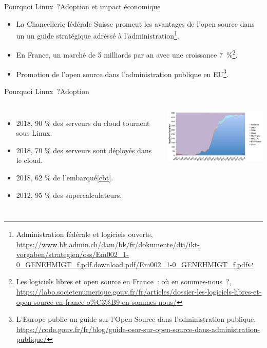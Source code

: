 \documentclass{beamer}
\begin{document}
    \begin{frame}{Pourquoi Linux~?}{Adoption et impact économique}
        \begin{itemize}
            \item {} La Chancellerie fédérale Suisse promeut les avantages de l'open source dans un un guide stratégique adréssé à l'administration\footnote{Administration fédérale et logiciels ouverts, \url{https://www.bk.admin.ch/dam/bk/fr/dokumente/dti/ikt-vorgaben/strategien/oss/Em002_1-0_GENEHMIGT_f.pdf.download.pdf/Em002_1-0_GENEHMIGT_f.pdf}}.
            \item {} En France, un marché de 5 milliards par an avec une croissance 7~\%\footnote{Les logiciels libres et open source en France~: où en sommes-nous~?, \url{https://labo.societenumerique.gouv.fr/fr/articles/dossier-les-logiciels-libres-et-open-source-en-france-o\%C3\%B9-en-sommes-nous/}}.
            \item {} Promotion de l'open source dans l'administration publique en EU\footnote{L'Europe publie un guide sur l'Open Source dans l'administration publique, \url{https://code.gouv.fr/fr/blog/guide-osor-sur-open-source-dans-administration-publique/}}.
        \end{itemize}
    \end{frame}

    \begin{frame}{Pourquoi Linux~?}{Adoption}
        \begin{columns}
            \begin{itemize}
                \item 2018, 90 \% des serveurs du cloud tournent sous Linux\footnotemark.
                \item 2018, 70 \% des serveurs sont déployés dans le cloud\footnotemark.
                \item 2018, 62 \% de l'embarqué\cref{cbt}.
                \item 2012, 95 \% des supercalculateurs\footnotemark.
            \end{itemize}
            \centering
            \includegraphics[width=6cm]{image/linux-supercomputer-growth}
        \end{columns}
    \end{frame}
\end{document}
